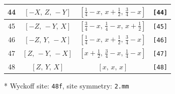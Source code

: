 \documentclass[fleqn,8pt]{jsarticle}
\begin{document}
\begin{longtable}{cccc}
44 & $\left[ - X,\, Z,\, - Y \right]$ & $\left[ \frac{1}{4} - x,\, x + \frac{1}{2},\, \frac{3}{4} - x \right]$ & {\tt [44]} \\ \hline
45 & $\left[ - Z,\, - Y,\, X \right]$ & $\left[ \frac{3}{4} - x,\, \frac{1}{4} - x,\, x + \frac{1}{2} \right]$ & {\tt [45]} \\ \hline
46 & $\left[ - Z,\, Y,\, - X \right]$ & $\left[ \frac{1}{4} - x,\, x + \frac{1}{2},\, \frac{3}{4} - x \right]$ & {\tt [46]} \\ \hline
47 & $\left[ Z,\, - Y,\, - X \right]$ & $\left[ x + \frac{1}{2},\, \frac{3}{4} - x,\, \frac{1}{4} - x \right]$ & {\tt [47]} \\ \hline
48 & $\left[ Z,\, Y,\, X \right]$ & $\left[ x,\, x,\, x \right]$ & {\tt [48]} \\
\end{longtable}
* Wyckoff site: {\tt 48f}, site symmetry: {\tt 2.mm}
\renewcommand{\arraystretch}{1.2}
\end{document}
